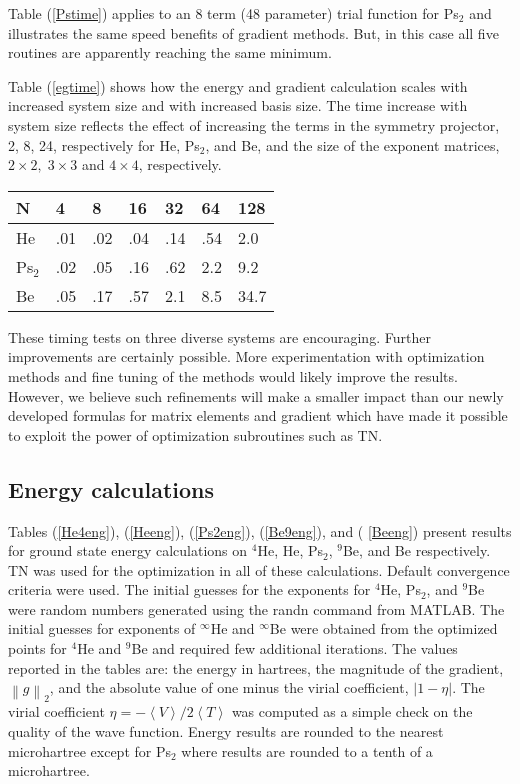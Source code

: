 \documentclass[12pt,thmsa,suthesis,verbatim]{report}
\begin{document}
Table (\ref{Pstime}) applies to an 8 term (48 parameter) trial function for
Ps$_2$ and illustrates the same speed benefits of gradient methods. But, in
this case all five routines are apparently reaching the same minimum.

Table (\ref{egtime}) shows how the energy and gradient calculation scales
with increased system size and with increased basis size. The time increase
with system size reflects the effect of increasing the terms in the symmetry
projector, 2, 8, 24, respectively for He, Ps$_2$, and Be, and the size of
the exponent matrices, $2\times 2,\;3\times 3$ and $4\times 4$, respectively.

\begin{tabular}{lllllll}
\hline\hline
N & 4 & 8 & 16 & 32 & 64 & 128 \\ \hline
He & .01 & .02 & .04 & .14 & .54 & 2.0 \\ 
Ps$_2$ & .02 & .05 & .16 & .62 & 2.2 & 9.2 \\ 
Be & .05 & .17 & .57 & 2.1 & 8.5 & 34.7 \\ \hline\hline
\end{tabular}
\caption{Time, in seconds, for 1 energy and gradient evaluation for
 He, Ps$_{2}$, Be using from 4 to 128 trial functions\label{egtime}}%

These timing tests on three diverse systems are encouraging. Further
improvements are certainly possible. More experimentation with optimization
methods and fine tuning of the methods would likely improve the results.
However, we believe such refinements will make a smaller impact than our
newly developed formulas for matrix elements and gradient which have made it
possible to exploit the power of optimization subroutines such as TN.

\subsection{Energy calculations}

Tables (\ref{He4eng}), (\ref{Heeng}), (\ref{Ps2eng}), (\ref{Be9eng}), and (%
\ref{Beeng}) present results for ground state energy calculations on $^4$He,
He, Ps$_2$, $^9$Be, and Be respectively. TN was used for the optimization in
all of these calculations. Default convergence criteria were used. The
initial guesses for the exponents for $^4$He, Ps$_2$, and $^9$Be were random
numbers generated using the randn command from MATLAB. The initial guesses
for exponents of $^\infty $He and $^\infty $Be were obtained from the
optimized points for $^4$He and $^9$Be and required few additional
iterations. The values reported in the tables are: the energy in hartrees,
the magnitude of the gradient, $\left\| g\right\| _2$, and the absolute
value of one minus the virial coefficient, $\left| 1-\eta \right| $. The
virial coefficient $\eta =-\left\langle V\right\rangle /2\left\langle
T\right\rangle $ was computed as a simple check on the quality of the wave
function. Energy results are rounded to the nearest microhartree except for
Ps$_2$ where results are rounded to a tenth of a microhartree.
\end{document}
